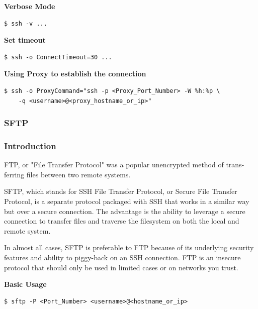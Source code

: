 \documentclass{article}
\newenvironment{codetemplate}[1][]{%
  \mybasecolorbox[#1]
  \itshape
}{%
  \endmybasecolorbox
}
\begin{document}
\textbf{Verbose Mode}
\begin{codetemplate}{}
\begin{verbatim}
$ ssh -v ...
\end{verbatim}
\end{codetemplate}

\textbf{Set timeout}
\begin{codetemplate}{}
\begin{verbatim}
$ ssh -o ConnectTimeout=30 ...
\end{verbatim}
\end{codetemplate}

\textbf{Using Proxy to establish the connection}
\begin{codetemplate}{}
\begin{verbatim}
$ ssh -o ProxyCommand="ssh -p <Proxy_Port_Number> -W %h:%p \
    -q <username>@<proxy_hostname_or_ip>"
\end{verbatim}
\end{codetemplate}

\subsubsection{SFTP}

\subsubsection{Introduction}
FTP, or "File Transfer Protocol" was a popular unencrypted method of trans-
ferring files between two remote systems.

SFTP, which stands for SSH File Transfer Protocol, or Secure File Transfer
Protocol, is a separate protocol packaged with SSH that works in a similar way
but over a secure connection. The advantage is the ability to leverage a secure
connection to transfer files and traverse the filesystem on both the local and
remote system.

In almost all cases, SFTP is preferable to FTP because of its underlying security
features and ability to piggy-back on an SSH connection. FTP is an insecure
protocol that should only be used in limited cases or on networks you trust.

\textbf{Basic Usage}
\begin{codetemplate}{}
\begin{verbatim}
$ sftp -P <Port_Number> <username>@<hostname_or_ip>
\end{verbatim}
\end{codetemplate}
\end{document}
